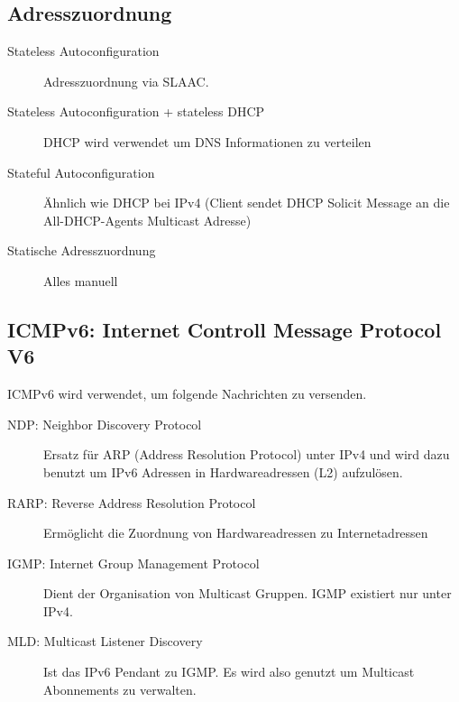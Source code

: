 \subsection{Adresszuordnung}
\begin{description}
	\item[Stateless Autoconfiguration] Adresszuordnung via SLAAC.
	\item[Stateless Autoconfiguration + stateless DHCP] DHCP wird verwendet um DNS Informationen zu verteilen
	\item[Stateful Autoconfiguration] Ähnlich wie DHCP bei IPv4 (Client sendet DHCP Solicit Message an die All-DHCP-Agents Multicast Adresse)
	\item[Statische Adresszuordnung] Alles manuell
\end{description}

\subsection{ICMPv6: Internet Controll Message Protocol V6}
ICMPv6 wird verwendet, um folgende Nachrichten zu versenden.

\begin{description}
	\item[NDP: Neighbor Discovery Protocol] Ersatz für ARP (Address Resolution Protocol) unter IPv4 und wird dazu benutzt um IPv6 Adressen in Hardwareadressen (L2) aufzulösen.
	\item[RARP: Reverse Address Resolution Protocol] Ermöglicht die Zuordnung von Hardwareadressen zu Internetadressen
	\item[IGMP: Internet Group Management Protocol] Dient der Organisation von Multicast Gruppen. IGMP existiert nur unter IPv4.
	\item[MLD: Multicast Listener Discovery] Ist das IPv6 Pendant zu IGMP. Es wird also genutzt um Multicast Abonnements zu verwalten.
\end{description}

